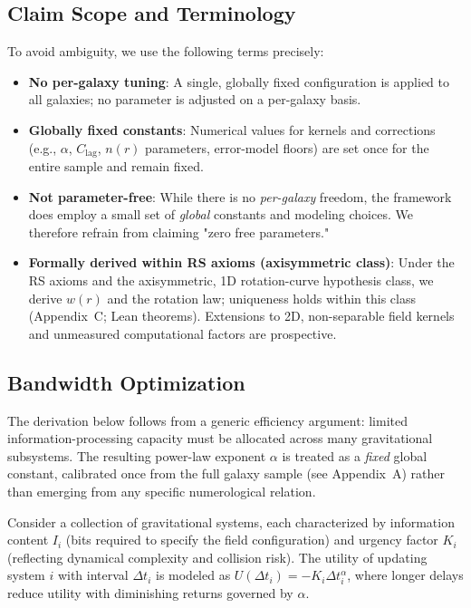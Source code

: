\documentclass[12pt,a4paper]{article}
\begin{document}
\subsection*{Claim Scope and Terminology}
\noindent To avoid ambiguity, we use the following terms precisely:
\begin{itemize}
  \item \textbf{No per-galaxy tuning}: A single, globally fixed configuration is applied to all galaxies; no parameter is adjusted on a per-galaxy basis.
  \item \textbf{Globally fixed constants}: Numerical values for kernels and corrections (e.g., $\alpha$, $C_\mathrm{lag}$, $n(r)$ parameters, error-model floors) are set once for the entire sample and remain fixed.
  \item \textbf{Not parameter-free}: While there is no \emph{per-galaxy} freedom, the framework does employ a small set of \emph{global} constants and modeling choices. We therefore refrain from claiming "zero free parameters."
  \item \textbf{Formally derived within RS axioms (axisymmetric class)}: Under the RS axioms and the axisymmetric, 1D rotation-curve hypothesis class, we derive $w(r)$ and the rotation law; uniqueness holds within this class (Appendix~C; Lean theorems). Extensions to 2D, non-separable field kernels and unmeasured computational factors are prospective.
\end{itemize}

\subsection{Bandwidth Optimization}

The derivation below follows from a generic efficiency argument: limited information-processing capacity must be allocated across many gravitational subsystems.  The resulting power-law exponent $\alpha$ is treated as a \emph{fixed} global constant, calibrated once from the full galaxy sample (see Appendix~A) rather than emerging from any specific numerological relation.

Consider a collection of gravitational systems, each characterized by information content $I_i$ (bits required to specify the field configuration) and urgency factor $K_i$ (reflecting dynamical complexity and collision risk). The utility of updating system $i$ with interval $\Delta t_i$ is modeled as $U(\Delta t_i) = -K_i \Delta t_i^\alpha$, where longer delays reduce utility with diminishing returns governed by $\alpha$.
\end{document}
